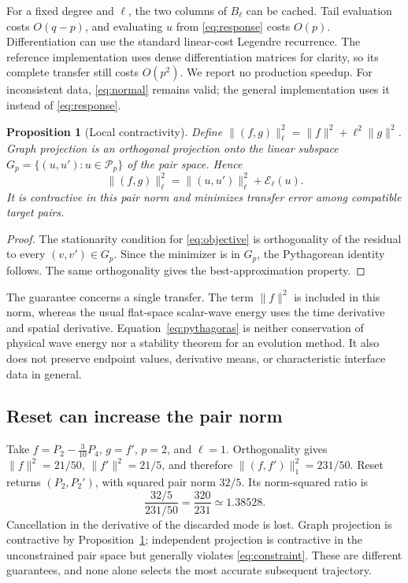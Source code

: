 \documentclass[11pt]{article}
\newtheorem{proposition}[theorem]{Proposition}
\newcommand{\PP}{\mathcal P}
\newcommand{\norm}[1]{\lVert #1\rVert}
\begin{document}
For a fixed degree and \(\ell\), the two columns of \(B_\ell\) can be cached. Tail evaluation costs \(O(q-p)\), and evaluating \(u\) from \eqref{eq:response} costs \(O(p)\). Differentiation can use the standard linear-cost Legendre recurrence. The reference implementation uses dense differentiation matrices for clarity, so its complete transfer still costs \(O(p^2)\). We report no production speedup. For inconsistent data, \eqref{eq:normal} remains valid; the general implementation uses it instead of \eqref{eq:response}.

\begin{proposition}[Local contractivity]\label{prop:contract}
Define \(\norm{(f,g)}_\ell^2=\norm f^2+\ell^2\norm g^2\). Graph projection is an orthogonal projection onto the linear subspace \(G_p=\{(u,u'):u\in\PP_p\}\) of the pair space. Hence
\begin{equation}\label{eq:pythagoras}
 \norm{(f,g)}_\ell^2=\norm{(u,u')}_\ell^2+\mathcal E_\ell(u).
\end{equation}
It is contractive in this pair norm and minimizes transfer error among compatible target pairs.
\end{proposition}
\begin{proof}
The stationarity condition for \eqref{eq:objective} is orthogonality of the residual to every \((v,v')\in G_p\). Since the minimizer is in \(G_p\), the Pythagorean identity follows. The same orthogonality gives the best-approximation property.
\end{proof}

The guarantee concerns a single transfer. The term \(\norm f^2\) is included in this norm, whereas the usual flat-space scalar-wave energy uses the time derivative and spatial derivative. Equation~\eqref{eq:pythagoras} is neither conservation of physical wave energy nor a stability theorem for an evolution method. It also does not preserve endpoint values, derivative means, or characteristic interface data in general.

\subsection{Reset can increase the pair norm}
Take \(f=P_2-\tfrac3{10}P_4\), \(g=f'\), \(p=2\), and \(\ell=1\). Orthogonality gives \(\norm f^2=21/50\), \(\norm{f'}^2=21/5\), and therefore \(\norm{(f,f')}_1^2=231/50\). Reset returns \((P_2,P_2')\), with squared pair norm \(32/5\). Its norm-squared ratio is
\begin{equation}\label{eq:counter}
 \frac{32/5}{231/50}=\frac{320}{231}\simeq1.38528.
\end{equation}
Cancellation in the derivative of the discarded mode is lost. Graph projection is contractive by Proposition~\ref{prop:contract}; independent projection is contractive in the unconstrained pair space but generally violates \eqref{eq:constraint}. These are different guarantees, and none alone selects the most accurate subsequent trajectory.
\end{document}
